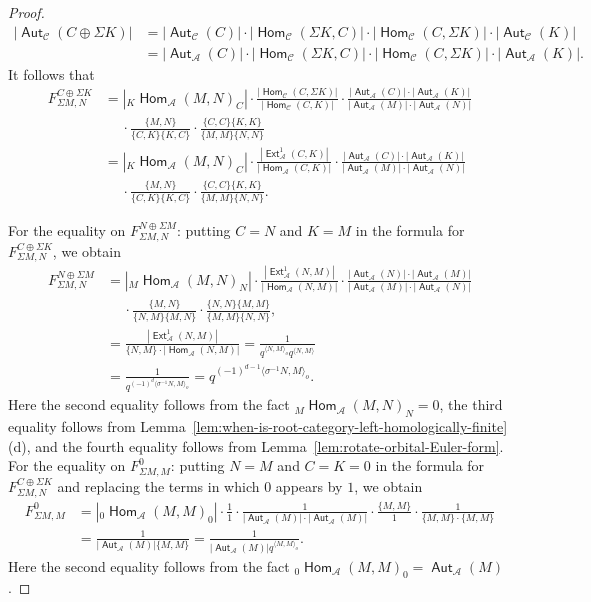 \documentclass[reqno,12pt,a4paper]{amsart}
\theoremstyle{remark}
\theoremstyle{definition}
\newcommand{\opname}[1]{\operatorname{\mathsf{#1}}}
\newcommand{\Hom}{\opname{Hom}}
\newcommand{\Aut}{\opname{Aut}}
\newcommand{\Ext}{\opname{Ext}}
\newcommand{\ca}{{\mathcal A}}
\newcommand{\cc}{{\mathcal C}}
\numberwithin{equation}{section}
\begin{document}
\begin{proof}
\begin{align*}
|\Aut_\cc(C\oplus\Sigma K)|&=|\Aut_\cc(C)|\cdot|\Hom_\cc(\Sigma K,C)|\cdot|\Hom_\cc(C,\Sigma K)|\cdot|\Aut_\cc(K)|\\
&=|\Aut_\ca(C)|\cdot|\Hom_\cc(\Sigma K,C)|\cdot|\Hom_\cc(C,\Sigma K)|\cdot|\Aut_\ca(K)|.
\end{align*}
It follows that
\begin{align*}
F_{\Sigma M,N}^{C\oplus \Sigma K}&=|{}_K\Hom_\ca(M,N)_C|\cdot\frac{|\Hom_\cc(C,\Sigma K)|}{|\Hom_\cc(C,K)|}\cdot\frac{|\Aut_\ca(C)|\cdot |\Aut_\ca(K)|}{|\Aut_\ca(M)|\cdot |\Aut_\ca(N)|}\\
&\hspace{15pt}\cdot\frac{\{M,N\}}{\{C,K\}\{K,C\}}\cdot \frac{\{C,C\}\{K,K\}}{\{M,M\}\{N,N\}}\\
&=|{}_K\Hom_\ca(M,N)_C|\cdot\frac{|\Ext^1_\ca(C,K)|}{|\Hom_\ca(C,K)|}\cdot\frac{|\Aut_\ca(C)|\cdot |\Aut_\ca(K)|}{|\Aut_\ca(M)|\cdot |\Aut_\ca(N)|}\\
&\hspace{15pt}\cdot\frac{\{M,N\}}{\{C,K\}\{K,C\}}\cdot \frac{\{C,C\}\{K,K\}}{\{M,M\}\{N,N\}}.
\end{align*}

For the equality on $F_{\Sigma M,N}^{N\oplus\Sigma M}$: putting $C=N$ and $K=M$ in the formula for $F_{\Sigma M,N}^{C\oplus \Sigma K}$, we obtain
\begin{align*}
F_{\Sigma M,N}^{N\oplus \Sigma M}&=|{}_M\Hom_\ca(M,N)_N|\cdot\frac{|\Ext^1_\ca(N,M)|}{|\Hom_\ca(N,M)|}\cdot\frac{|\Aut_\ca(N)|\cdot |\Aut_\ca(M)|}{|\Aut_\ca(M)|\cdot |\Aut_\ca(N)|}\\
&\hspace{15pt}\cdot\frac{\{M,N\}}{\{N,M\}\{M,N\}}\cdot \frac{\{N,N\}\{M,M\}}{\{M,M\}\{N,N\}},\\
&=\frac{|\Ext^1_\ca(N,M)|}{\{N,M\}\cdot |\Hom_\ca(N,M)|}=\frac{1}{q^{\langle N,M\rangle_o}q^{\langle N,M\rangle}}\\
&=\frac{1}{q^{(-1)^d \langle \sigma^{-1}N,M\rangle_o}}=q^{(-1)^{d-1} \langle \sigma^{-1}N,M\rangle_o}.
\end{align*}
Here the second equality follows from the fact ${}_M\Hom_\ca(M,N)_N=0$, the third equality follows from Lemma~\ref{lem:when-is-root-category-left-homologically-finite} (d), and the fourth equality follows from Lemma~\ref{lem:rotate-orbital-Euler-form}.
For the equality on $F_{\Sigma M,M}^0$: putting $N=M$ and $C=K=0$ in the formula for $F_{\Sigma M,N}^{C\oplus\Sigma K}$ and replacing the terms in which $0$ appears by $1$, we obtain
\begin{align*}
F_{\Sigma M,M}^0&=|{}_0\Hom_\ca(M,M)_0|\cdot\frac{1}{1}\cdot\frac{1}{|\Aut_\ca(M)|\cdot|\Aut_\ca(M)|}\cdot\frac{\{M,M\}}{1}\cdot \frac{1}{\{M,M\}\cdot\{M,M\}}\\
&=\frac{1}{|\Aut_\ca(M)|\{M,M\}}=\frac{1}{|\Aut_\ca(M)|q^{\langle M,M\rangle_o}}.
\end{align*}
Here the second equality follows from the fact ${}_0\Hom_\ca(M,M)_0=\Aut_\ca(M)$.


\end{proof}
\end{document}
